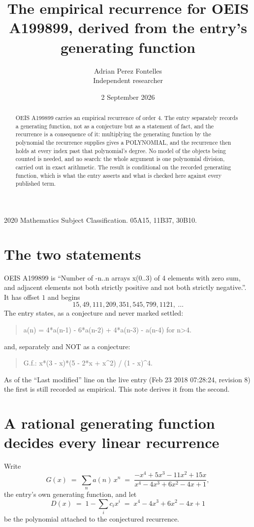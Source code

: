 \documentclass[11pt,a4paper]{article}
\title{The empirical recurrence for OEIS A199899, derived from the entry's generating function}
\author{Adrian Perez Fontelles\\ \small Independent researcher}
\date{2 September 2026}
\theoremstyle{plain}
\theoremstyle{definition}
\begin{document}
\maketitle

\begin{abstract}
OEIS A199899 carries an empirical recurrence of order $4$. The entry separately records a
generating function, not as a conjecture but as a statement of fact, and the recurrence is a
consequence of it: multiplying the generating function by the polynomial the recurrence
supplies gives a POLYNOMIAL, and the recurrence then holds at every index past that
polynomial's degree. No model of the objects being counted is needed, and no search: the
whole argument is one polynomial division, carried out in exact arithmetic. The result is
conditional on the recorded generating function, which is what the entry asserts and what is
checked here against every published term.
\end{abstract}

\noindent\small 2020 Mathematics Subject Classification. 05A15, 11B37, 30B10.\normalsize

\section{The two statements}

OEIS A199899 is ``Number of -n..n arrays x(0..3) of 4 elements with zero sum, and adjacent elements not both strictly positive and not both strictly negative.''. It has offset $1$ and begins
\[
15, 49, 111, 209, 351, 545, 799, 1121,\ \dots
\]
The entry states, as a conjecture and never marked settled:
\begin{quote}
a(n) = 4*a(n-1) - 6*a(n-2) + 4*a(n-3) - a(n-4) for n>4.
\end{quote}
and, separately and NOT as a conjecture:
\begin{quote}
G.f.: x*(3 - x)*(5 - 2*x + x\^{}2) / (1 - x)\^{}4.
\end{quote}
As of the ``Last modified'' line on the live entry (Feb 23 2018 07:28:24, revision 8) the first is still
recorded as empirical. This note derives it from the second.

\section{A rational generating function decides every linear recurrence}

Write
\[
G(x)\;=\;\sum_{n}a(n)\,x^{n}\;=\;\frac{- x^{4} + 5 x^{3} - 11 x^{2} + 15 x}{x^{4} - 4 x^{3} + 6 x^{2} - 4 x + 1},
\]
the entry's own generating function, and let
\[
D(x)\;=\;1-\sum_i c_i x^{i}\;=\;x^{4} - 4 x^{3} + 6 x^{2} - 4 x + 1
\]
be the polynomial attached to the conjectured recurrence.
\end{document}

